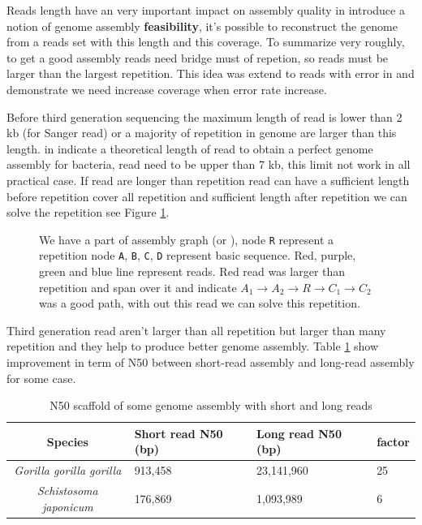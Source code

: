 \documentclass[./main.tex]{subfiles}
\begin{document}
Reads length have an very important impact on assembly quality \citeauthor{Bresler_Tse} in \cite{Bresler_Tse} introduce a notion of genome assembly \textbf{feasibility}, it's possible to reconstruct the genome from a reads set with this length and this coverage. To summarize very roughly, to get a good assembly reads need bridge must of repetion, so reads must be larger than the largest repetition. This idea was extend to reads with error in \cite{feasibility_with_error} and demonstrate we need increase coverage when error rate increase.

Before third generation sequencing the maximum length of read is lower than 2 kb (for Sanger read) or a majority of repetition in genome are larger than this length. \citeauthor{one_chromosome_one_contig} in \cite{one_chromosome_one_contig} indicate a theoretical length of read to obtain a perfect genome assembly for bacteria, read need to be upper than 7 kb, this limit not work in all practical case. If read are longer than repetition read can have a sufficient length before repetition cover all repetition and sufficient length after repetition we can solve the repetition see Figure \ref{intro:fig:whylongreads}.

\begin{figure}[ht]
    \centering
    
    \caption{We have a part of assembly graph (\OLC or \DBG), node \texttt{R} represent a repetition node \texttt{A}, \texttt{B}, \texttt{C}, \texttt{D} represent basic sequence. Red, purple, green and blue line represent reads. Red read was larger than repetition and span over it and indicate $A_1 \rightarrow A_2 \rightarrow R \rightarrow C_1 \rightarrow C_2$ was a good path, with out this read we can solve this repetition.}
    \label{intro:fig:whylongreads}
\end{figure}

Third generation read aren't larger than all repetition but larger than many repetition and they help to produce better genome assembly. Table \ref{intro:tab:sr_lr_assembly} show improvement in term of N50 between short-read assembly and long-read assembly for some case. 

\begin{table}[]
    \centering
    \begin{tabular}{c|lll}
        Species & Short read N50 (bp) & Long read N50 (bp) & factor \\ \hline
        \textit{Gorilla gorilla gorilla} & 913,458 \cite{gorilla_sr_assembly} & 23,141,960 \cite{gorilla_genome} & 25 \\
        \textit{Schistosoma japonicum} & 176,869 \cite{s_japonicum_sr_assembly} & 1,093,989 \cite{s_japonicum_3rd_gene_improvement} & 6 \\
    \end{tabular}
    \caption{N50 scaffold of some genome assembly with short and long reads}
    \label{intro:tab:sr_lr_assembly}
\end{table}
\end{document}
